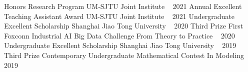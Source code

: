 


\begin{cvhonors}

  \cvhonor
    {Honors Research Program} %
    {UM-SJTU Joint Institute} %
    {~} %
    {2021} %
  \cvhonor
    {Annual Excellent Teaching Assistant Award} %
    {UM-SJTU Joint Institute} %
    {~} %
    {2021} %
  \cvhonor
    {Undergraduate Excellent Scholarship} %
    {Shanghai Jiao Tong University} %
    {~} %
    {2020} %
  \cvhonor
    {Third Prize} %
    {First Foxconn Industrial AI Big Data Challenge From Theory to Practice} %
    {~} %
    {2020} %
  \cvhonor
    {Undergraduate Excellent Scholarship} %
    {Shanghai Jiao Tong University} %
    {~} %
    {2019} %
  \cvhonor
    {Third Prize} %
    {Contemporary Undergraduate Mathematical Contest In Modeling} %
    {~} %
    {2019} %
\end{cvhonors}